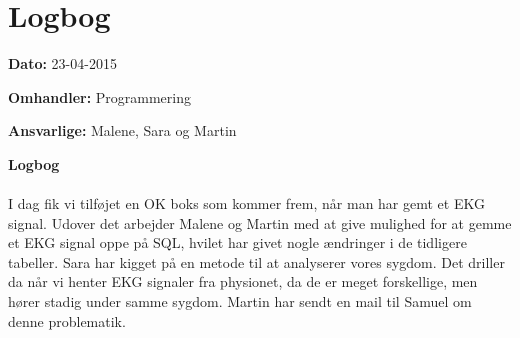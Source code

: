\chapter{Logbog}

\textbf{Dato:} 23-04-2015

\textbf{Omhandler:} Programmering

\textbf{Ansvarlige:} Malene, Sara og Martin

\textbf{Logbog}
\\
\\

I dag fik vi tilføjet en OK boks som kommer frem, når man har gemt et EKG signal. Udover det arbejder Malene og Martin med at give mulighed for at gemme et EKG signal oppe på SQL, hvilet har givet nogle ændringer i de tidligere tabeller. Sara har kigget på en metode til at analyserer vores sygdom. Det driller da når vi henter EKG signaler fra physionet, da de er meget forskellige, men hører stadig under samme sygdom. Martin har sendt en mail til Samuel om denne problematik.